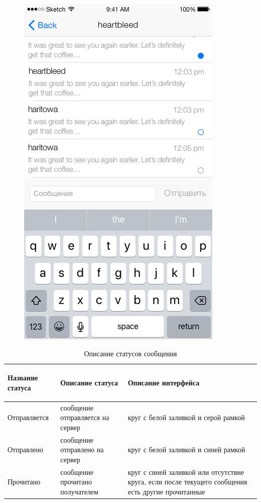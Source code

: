 \begin{figure}[H]
\begin{minipage}{.5\textwidth}
  \includegraphics[height=0.25\textheight]{inc/img/ui/single_dialogue.png}
  \label{sec:usage:dialogues:single}
\end{minipage}
\end{figure}

\begin{table}[!ht]
  \caption{Описание статусов сообщения}
  \label{table:usage:dialogues:statusdesc}
  \centering
  \begin{tabularx}{\linewidth}{
    |>{\hsize=0.75\hsize}X|
    >{\hsize=1\hsize}X|
    >{\centering\arraybackslash\hsize=1.25\hsize}X|
  }
	\hline
	\begin{center}Название статуса\end{center} & Описание статуса & Описание интерфейса \\

	\hline
	Отправляется & сообщение отправляется на сервер & круг с белой заливкой и серой рамкой \\

	\hline
	Отправлено & сообщение отправлено на сервер & круг с белой заливкой и синей рамкой \\

	\hline
	Прочитано & сообщение прочитано получателем & круг с синей заливкой или отсутствие круга, если после текущего сообщения есть другие прочитанные \\

	\hline
  \end{tabularx}
\end{table}